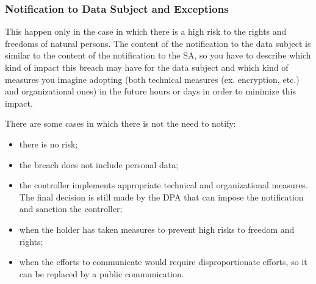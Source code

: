 \subsubsection{Notification to Data Subject and Exceptions}
This happen only in the case in which there is a high risk to the rights and freedoms of natural persons. The content of the notification to the data subject is similar to the content of the notification to the SA, so you have to describe which kind of impact this breach may have for the data subject and which kind of measures you imagine adopting (both technical measures (ex. encryption, etc.) and organizational ones) in the future hours or days in order to minimize this impact.

There are some cases in which there is not the need to notify:
\begin{itemize}
    \item there is no risk;
    \item the breach does not include personal data;
    \item the controller implements appropriate technical and organizational measures. The final decision is still made by the DPA that can impose the notification and sanction the controller;
    \item when the holder has taken measures to prevent high risks to freedom and rights;
    \item when the efforts to communicate would require disproportionate efforts, so it can be replaced by a public communication.
\end{itemize}

